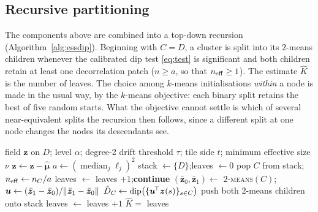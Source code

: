 \subsection{Recursive partitioning}\label{subsec:algo}

The components above are combined into a top-down recursion
(Algorithm~\ref{alg:essdip}). Beginning with $C=D$, a cluster is split into
its $2$-means children whenever the calibrated dip test \eqref{eq:test} is
significant and both children retain at least one decorrelation patch
($n\ge a$, so that $n_{\mathrm{eff}}\ge1$).  The estimate
$\hat K$ is the number of leaves. The choice among $k$-means
initialisations \emph{within} a node is made in the usual way, by the $k$-means
objective: each binary split retains the best of five random starts. What the
objective cannot settle is which of several near-equivalent splits the
recursion then follows, since a different split at one node changes the nodes
its descendants see. 

\begin{algorithm}[t]
\caption{ESS-calibrated modality test for $K$ (single ensemble member)}
\label{alg:essdip}
\begin{algorithmic}[1]
\Require field $\bm z$ on $D$; level $\alpha$; degree-2 drift threshold $\tau$;
         tile side $t$; minimum effective size $\nu$
  \State $\bm z\gets \bm z-\hat{\bm\mu}$
\EndIf
\State $a\gets(\operatorname{median}_j \ell_j)^2$ 
\State stack $\gets\{D\}$;\quad leaves $\gets 0$
  \State pop $C$ from stack;\quad $n_{\mathrm{eff}}\gets n_C/a$
  \If{$\neff<\nu$}\State leaves $\gets$ leaves $+1$;\quad \textbf{continue}
  \EndIf
  \State $(\bar{\bm z}_0,\bar{\bm z}_1)\gets$ \textsc{$2$-means}$(C)$;\quad
         $\bm u\gets(\bar{\bm z}_1-\bar{\bm z}_0)/\lVert \bar{\bm z}_1-\bar{\bm z}_0 \rVert$
  \State $\hat D_C\gets\mathrm{dip}\bigl(\{\bm u^{\!\top}\bm z(s)\}_{s\in C}\bigr)$
     \State push both $2$-means children onto stack
  \Else
     \State leaves $\gets$ leaves $+1$
  \EndIf
\EndWhile
\State \Return $\hat K=$ leaves
\end{algorithmic}
\end{algorithm}

